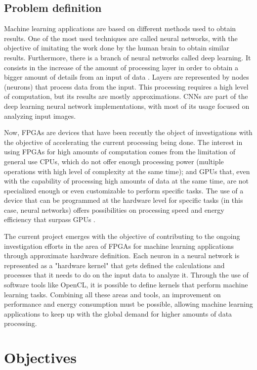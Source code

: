 \subsection{Problem definition}

Machine learning applications are based on different methods used to obtain results.
One of the most used techniques are called neural networks, with the objective of imitating the work
done by the human brain to obtain similar results. Furthermore, there is a branch of neural networks
called deep learning. It consists in the increase of the amount of processing layer in order to obtain
a bigger amount of details from an input of data \cite{deeplearningoverview}. Layers are represented by nodes (neurons)
that process data from the input. This processing requires a high level of computation, but its
results are mostly approximations. CNNs are part of the deep learning neural network implementations, with most
of its usage focused on analyzing input images.

Now, FPGAs are devices that have been recently the object of investigations with the objective of accelerating
the current processing being done. The interest in using FPGAs for high amounts of computation comes from
the limitation of general use CPUs, which do not offer enough processing power (multiple operations with 
high level of complexity at the same time); and GPUs that, even with the capability of processing high
amounts of data at the same time, are not specialized enough or even customizable to perform specific tasks.
The use of a device that can be programmed at the hardware level for specific tasks (in this case, neural networks)
offers possibilities on processing speed and energy efficiency that surpass GPUs \cite{surveyfpgann}.

The current project emerges with the objective of contributing to the ongoing investigation efforts
in the area of FPGAs for machine learning applications through approximate hardware definition.
Each neuron in a neural network is represented as a "hardware kernel" that gets defined the 
calculations and processes that it needs to do on the input data to analyze it.
Through the use of software tools like OpenCL, it is possible to define kernels that perform
machine learning tasks. Combining all these areas and tools, an improvement on performance and
energy consumption must be possible, allowing machine learning applications to keep up
with the global demand for higher amounts of data processing.


\section{Objectives}

